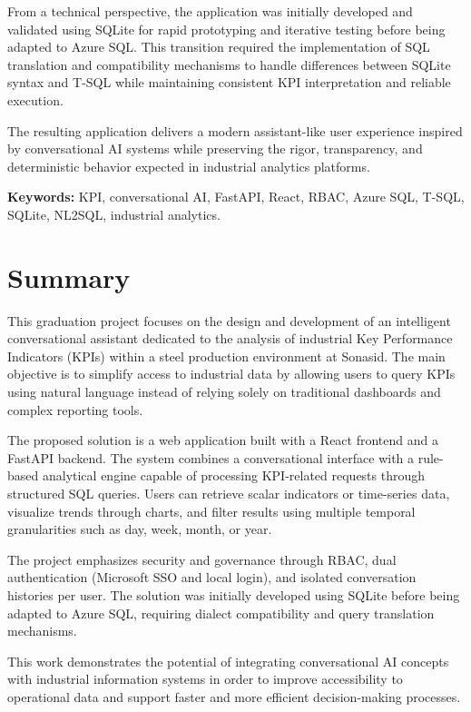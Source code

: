 \documentclass[12pt,a4paper,openany]{report}
\begin{document}
From a technical perspective, the application was initially developed and validated using SQLite for rapid prototyping and iterative testing before being adapted to Azure SQL. This transition required the implementation of SQL translation and compatibility mechanisms to handle differences between SQLite syntax and T-SQL while maintaining consistent KPI interpretation and reliable execution.

The resulting application delivers a modern assistant-like user experience inspired by conversational AI systems while preserving the rigor, transparency, and deterministic behavior expected in industrial analytics platforms.

\vspace{1em}
\noindent\textbf{Keywords:} KPI, conversational AI, FastAPI, React, RBAC, Azure SQL, T-SQL, SQLite, NL2SQL, industrial analytics.

\chapter*{Summary}
This graduation project focuses on the design and development of an intelligent conversational assistant dedicated to the analysis of industrial Key Performance Indicators (KPIs) within a steel production environment at Sonasid. The main objective is to simplify access to industrial data by allowing users to query KPIs using natural language instead of relying solely on traditional dashboards and complex reporting tools.

The proposed solution is a web application built with a React frontend and a FastAPI backend. The system combines a conversational interface with a rule-based analytical engine capable of processing KPI-related requests through structured SQL queries. Users can retrieve scalar indicators or time-series data, visualize trends through charts, and filter results using multiple temporal granularities such as day, week, month, or year.

The project emphasizes security and governance through RBAC, dual authentication (Microsoft SSO and local login), and isolated conversation histories per user. The solution was initially developed using SQLite before being adapted to Azure SQL, requiring dialect compatibility and query translation mechanisms.

This work demonstrates the potential of integrating conversational AI concepts with industrial information systems in order to improve accessibility to operational data and support faster and more efficient decision-making processes.
\end{document}
